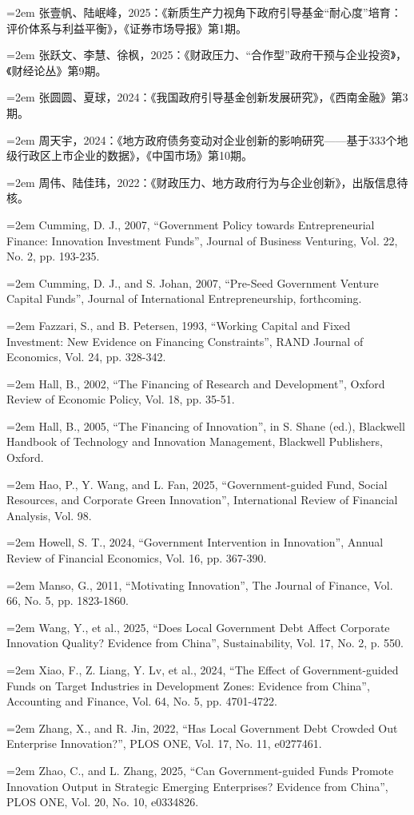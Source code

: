 \documentclass[UTF8,a4paper,zihao=5,fontset=fandol]{ctexart}
\newcommand{\ERJRef}[1]{%
  \par\noindent\hspace*{2em}\hangindent=2em\hangafter=1 {#1}\par%
}
\begin{document}
{\ERJRef{张壹帆、陆岷峰，2025：《新质生产力视角下政府引导基金“耐心度”培育：评价体系与利益平衡》，《证券市场导报》第1期。}
\ERJRef{张跃文、李慧、徐枫，2025：《财政压力、“合作型”政府干预与企业投资》，《财经论丛》第9期。}
\ERJRef{张圆圆、夏球，2024：《我国政府引导基金创新发展研究》，《西南金融》第3期。}
\ERJRef{周天宇，2024：《地方政府债务变动对企业创新的影响研究——基于333个地级行政区上市企业的数据》，《中国市场》第10期。}
\ERJRef{周伟、陆佳玮，2022：《财政压力、地方政府行为与企业创新》，出版信息待核。}
\ERJRef{Cumming, D. J., 2007, “Government Policy towards Entrepreneurial Finance: Innovation Investment Funds”, Journal of Business Venturing, Vol. 22, No. 2, pp. 193-235.}
\ERJRef{Cumming, D. J., and S. Johan, 2007, “Pre-Seed Government Venture Capital Funds”, Journal of International Entrepreneurship, forthcoming.}
\ERJRef{Fazzari, S., and B. Petersen, 1993, “Working Capital and Fixed Investment: New Evidence on Financing Constraints”, RAND Journal of Economics, Vol. 24, pp. 328-342.}
\ERJRef{Hall, B., 2002, “The Financing of Research and Development”, Oxford Review of Economic Policy, Vol. 18, pp. 35-51.}
\ERJRef{Hall, B., 2005, “The Financing of Innovation”, in S. Shane (ed.), Blackwell Handbook of Technology and Innovation Management, Blackwell Publishers, Oxford.}
\ERJRef{Hao, P., Y. Wang, and L. Fan, 2025, “Government-guided Fund, Social Resources, and Corporate Green Innovation”, International Review of Financial Analysis, Vol. 98.}
\ERJRef{Howell, S. T., 2024, “Government Intervention in Innovation”, Annual Review of Financial Economics, Vol. 16, pp. 367-390.}
\ERJRef{Manso, G., 2011, “Motivating Innovation”, The Journal of Finance, Vol. 66, No. 5, pp. 1823-1860.}
\ERJRef{Wang, Y., et al., 2025, “Does Local Government Debt Affect Corporate Innovation Quality? Evidence from China”, Sustainability, Vol. 17, No. 2, p. 550.}
\ERJRef{Xiao, F., Z. Liang, Y. Lv, et al., 2024, “The Effect of Government-guided Funds on Target Industries in Development Zones: Evidence from China”, Accounting and Finance, Vol. 64, No. 5, pp. 4701-4722.}
\ERJRef{Zhang, X., and R. Jin, 2022, “Has Local Government Debt Crowded Out Enterprise Innovation?”, PLOS ONE, Vol. 17, No. 11, e0277461.}
\ERJRef{Zhao, C., and L. Zhang, 2025, “Can Government-guided Funds Promote Innovation Output in Strategic Emerging Enterprises? Evidence from China”, PLOS ONE, Vol. 20, No. 10, e0334826.}
}

\vspace{2\baselineskip}
\end{document}
